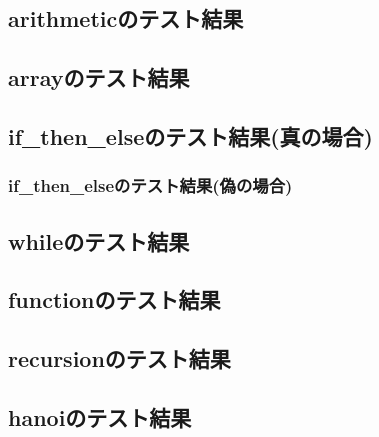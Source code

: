 \documentclass[dvipdfmx]{jsarticle}
\begin{document}
\subsection{arithmeticのテスト結果}
\label{appendix:arithmetic}


\subsection{arrayのテスト結果}
\label{appendix:array}


\subsection{if\_then\_elseのテスト結果(真の場合)}
\label{appendix:if_then_else}


\subsubsection{if\_then\_elseのテスト結果(偽の場合)}


\subsection{whileのテスト結果}
\label{appendix:while}


\subsection{functionのテスト結果}
\label{appendix:function}


\subsection{recursionのテスト結果}
\label{appendix:recursion}


\subsection{hanoiのテスト結果}
\label{appendix:hanoi}





\end{document}
